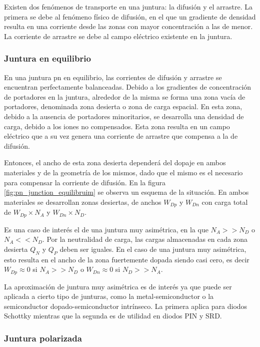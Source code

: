Existen dos fenómenos de transporte en una juntura: la difusión y el arrastre.
La primera se debe al fenómeno físico de difusión, en el que un gradiente de
densidad resulta en una corriente desde las zonas con mayor concentración a las
de menor. La corriente de arrastre se debe al campo eléctrico existente en la
juntura.

\subsubsection{Juntura en equilibrio}
\label{sec:pn_junction_equilibruim}

En una juntura pn en equilibrio, las corrientes de difusión y arrastre se
encuentran perfectamente balanceadas. Debido a los gradientes de concentración
de portadores en la juntura, alrededor de la misma se forma una zona vacía de
portadores, denominada zona desierta o zona de carga espacial. En esta zona,
debido a la ausencia de portadores minoritarios, se desarrolla una densidad de
carga, debido a los iones no compensados. Esta zona resulta en un campo
eléctrico que a su vez genera una corriente de arrastre que compensa a la de
difusión.

Entonces, el ancho de esta zona desierta dependerá del dopaje en ambos
materiales y de la geometría de los mismos, dado que el mismo es el necesario
para compensar la corriente de difusión. En la figura
\ref{fig:pn_junction_equilibruim} se observa un esquema de la situación. En
ambos materiales se desarrollan zonas desiertas, de anchos $W_{Dp}$ y $W_{Dn}$
con carga total de $W_{Dp} \times N_A$ y $W_{Dn} \times N_D$.

Es una caso de interés el de una juntura muy asimétrica, en la que $N_A >> N_D$
o $N_A << N_D$. Por la neutralidad de carga, las cargas almacenadas en cada zona
desierta $Q_N$ y $Q_P$ deben ser iguales. En el caso de una juntura muy
asimétrica, esto resulta en el ancho de la zona fuertemente dopada siendo casi
cero, es decir $W_{Dp} \approx 0$ si $N_A >> N_D$ o $W_{Dn} \approx 0$ si $N_D
>> N_A$.

La aproximación de juntura muy asimétrica es de interés ya que puede ser
aplicada a cierto tipo de junturas, como la metal-semiconductor o la
semiconductor dopado-semiconductor intrínseco. La primera aplica para diodos
Schottky mientras que la segunda es de utilidad en diodos PIN y SRD.

\subsubsection{Juntura polarizada}

